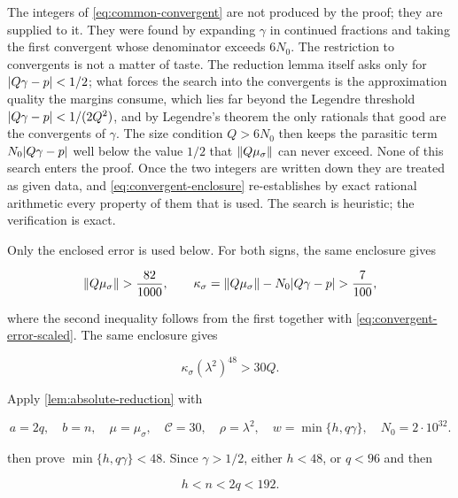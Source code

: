\begin{remark}
\label{rem:convergent-provenance}
The integers of \cref{eq:common-convergent} are not produced by the proof; they
are supplied to it. They were found by expanding $\gamma$ in continued
fractions and taking the first convergent whose denominator exceeds $6N_0$.
The restriction to convergents is not a matter of taste. The reduction lemma
itself asks only for $\lvert Q\gamma-p\rvert<1/2$; what forces the search into the
convergents is the approximation quality the margins consume, which lies far
beyond the Legendre threshold $\lvert Q\gamma-p\rvert<1/(2Q^2)$, and by Legendre's
theorem the only rationals that good are the convergents of $\gamma$. The size
condition $Q>6N_0$ then keeps the parasitic term $N_0\lvert Q\gamma-p\rvert$ well
below the value $1/2$ that $\left\lVert Q\mu_\sigma\right\rVert$ can never exceed. None of this
search enters the proof. Once the two integers are written down they are
treated as given data, and \cref{eq:convergent-enclosure} re-establishes by
exact rational arithmetic every property of them that is used. The search is
heuristic; the verification is exact.
\end{remark}

Only the enclosed error is used below. For both signs, the same enclosure
gives

\begin{equation}
 \left\lVert Q\mu_\sigma\right\rVert>\frac{82}{1000},
 \qquad
 \kappa_\sigma
 =\left\lVert Q\mu_\sigma\right\rVert-N_0\lvert Q\gamma-p\rvert>\frac7{100},
 \label{eq:fixed-kappa}
\end{equation}

where the second inequality follows from the first together with
\cref{eq:convergent-error-scaled}. The same enclosure gives

\begin{equation}
 \kappa_\sigma(\lambda^2)^{48}>30Q.
 \label{eq:fixed-cutoff}
\end{equation}

Apply \cref{lem:absolute-reduction} with

\begin{equation}
 a=2q,\quad b=n,\quad \mu=\mu_\sigma,\quad
 \mathcal C=30,\quad \rho=\lambda^2,\quad
 w=\min\{h,q\gamma\},\quad N_0=2\mathbin{\cdot}10^{32}.
\end{equation}

then prove $\min\{h,q\gamma\}<48$. Since $\gamma>1/2$, either $h<48$,
or $q<96$ and then

\begin{equation}
 h<n<2q<192.
\end{equation}

